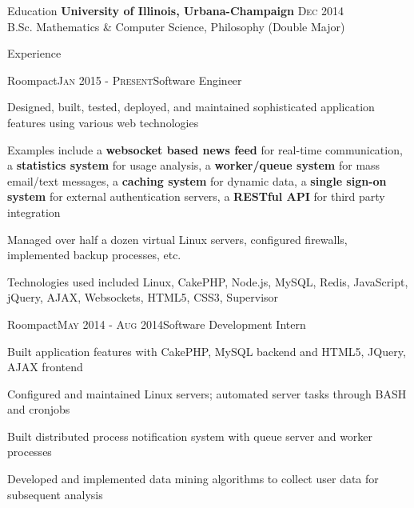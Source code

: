 \documentclass{resume} %
\begin{document}

\begin{rSection}{Education}
{\bf University of Illinois, Urbana-Champaign} \hfill {\textsc{Dec 2014}} \\ 
B.Sc. Mathematics \& Computer Science, Philosophy (Double Major)
\end{rSection}


\begin{rSection}{Experience}
\begin{rSubsection}{Roompact}{\textsc{Jan 2015 - Present}}{Software Engineer}{}
\item Designed, built, tested, deployed, and maintained sophisticated application features using various web technologies
\item Examples include a \textbf{websocket based news feed} for real-time communication, a \textbf{statistics system} for usage analysis, a \textbf{worker/queue system} for mass email/text messages, a \textbf{caching system} for dynamic data, a \textbf{single sign-on system} for external authentication servers, a \textbf{RESTful API} for third party integration
\item Managed over half a dozen virtual Linux servers, configured firewalls, implemented backup processes, etc.
\item Technologies used included Linux, CakePHP, Node.js, MySQL, Redis, JavaScript, jQuery, AJAX, Websockets, HTML5, CSS3, Supervisor
\end{rSubsection}


\begin{rSubsection}{Roompact}{\textsc{May 2014 - Aug 2014}}{Software Development Intern}{}
\item Built application features with CakePHP, MySQL backend and HTML5, JQuery, AJAX frontend
\item Configured and maintained Linux servers; automated server tasks through BASH and cronjobs
\item Built distributed process notification system with queue server and worker processes
\item Developed and implemented data mining algorithms to collect user data for subsequent analysis
\end{rSubsection}


\end{rSection}
\end{document}
